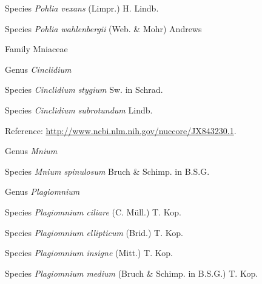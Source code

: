 \documentclass[9pt, article]{memoir}
\begin{document}
\begin{multicols}{2}
\vspace{6pt}\noindent\hspace{36pt}Species \textit{Pohlia vexans} (Limpr.) H. Lindb.


\vspace{6pt}\noindent\hspace{36pt}Species \textit{Pohlia wahlenbergii} (Web. \& Mohr) Andrews


\vspace{6pt}\noindent\hspace{24pt}Family Mniaceae


\vspace{6pt}\noindent\hspace{30pt}Genus \textit{Cinclidium}


\vspace{6pt}\noindent\hspace{36pt}Species \textit{Cinclidium stygium} Sw. in Schrad.


\vspace{6pt}\noindent\hspace{36pt}Species \textit{Cinclidium subrotundum} Lindb.


\vspace{6pt}Reference: 
\url{http://www.ncbi.nlm.nih.gov/nuccore/JX843230.1}.

\vspace{6pt}\noindent\hspace{30pt}Genus \textit{Mnium}


\vspace{6pt}\noindent\hspace{36pt}Species \textit{Mnium spinulosum} Bruch \& Schimp. in B.S.G.


\vspace{6pt}\noindent\hspace{30pt}Genus \textit{Plagiomnium}


\vspace{6pt}\noindent\hspace{36pt}Species \textit{Plagiomnium ciliare} (C. Müll.) T. Kop.


\vspace{6pt}\noindent\hspace{36pt}Species \textit{Plagiomnium ellipticum} (Brid.) T. Kop.


\vspace{6pt}\noindent\hspace{36pt}Species \textit{Plagiomnium insigne} (Mitt.) T. Kop.


\vspace{6pt}\noindent\hspace{36pt}Species \textit{Plagiomnium medium} (Bruch \& Schimp. in B.S.G.) T. Kop.



\end{multicols}
\end{document}
